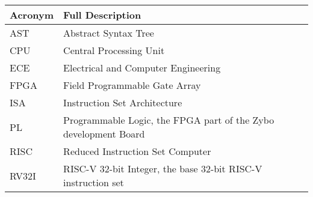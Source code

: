 \begin{table}[H]
	\begin{tabularx}{\textwidth}{| a | x |}
		\hline
		\textbf{Acronym} & \textbf{Full Description}                                       \\
		\hline
		AST              & Abstract Syntax Tree                                            \\
		CPU              & Central Processing Unit                                         \\
		ECE              & Electrical and Computer Engineering                             \\
		FPGA             & Field Programmable Gate Array                                   \\
		ISA              & Instruction Set Architecture                                    \\
		PL               & Programmable Logic, the FPGA part of the Zybo development Board \\
		RISC             & Reduced Instruction Set Computer                                \\
		RV32I            & RISC-V 32-bit Integer, the base 32-bit RISC-V instruction set   \\
		\hline
	\end{tabularx}
\end{table}

